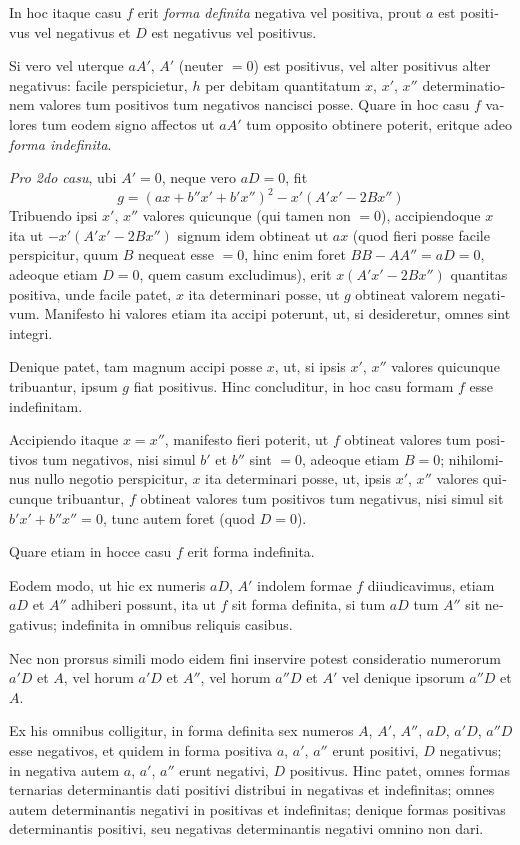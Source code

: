 \documentclass[12pt,a4paper]{article}
\theoremstyle{plain}
\theoremstyle{definition}
\theoremstyle{remark}
\begin{document}
\begin{otherlanguage}{latin}
In hoc itaque casu $f$ erit \emph{forma definita} negativa vel positiva, prout $a$ est positivus vel negativus et $D$ est negativus vel positivus.

Si vero vel uterque $aA'$, $A'$ (neuter $= 0$) est positivus, vel alter positivus alter negativus: facile perspicietur, $h$ per debitam quantitatum $x$, $x'$, $x''$ determinationem valores tum positivos tum negativos nancisci posse. Quare in hoc casu $f$ valores tum eodem signo affectos ut $aA'$ tum opposito obtinere poterit, eritque adeo \emph{forma indefinita}.

\textit{Pro 2do casu}, ubi $A' = 0$, neque vero $aD = 0$, fit
\[
g = (ax + b''x' + b'x'')^2 - x'(A'x' - 2Bx'')
\]
Tribuendo ipsi $x'$, $x''$ valores quicunque (qui tamen non $= 0$), accipiendoque $x$ ita ut $-x'(A'x' - 2Bx'')$ signum idem obtineat ut $ax$ (quod fieri posse facile perspicitur, quum $B$ nequeat esse $= 0$, hinc enim foret $BB - AA'' = aD = 0$, adeoque etiam $D = 0$, quem casum excludimus), erit $x(A'x' - 2Bx'')$ quantitas positiva, unde facile patet, $x$ ita determinari posse, ut $g$ obtineat valorem negativum. Manifesto hi valores etiam ita accipi poterunt, ut, si desideretur, omnes sint integri.

Denique patet, tam magnum accipi posse $x$, ut, si ipsis $x'$, $x''$ valores quicunque tribuantur, ipsum $g$ fiat positivus. Hinc concluditur, in hoc casu formam $f$ esse indefinitam.

Accipiendo itaque $x = x''$, manifesto fieri poterit, ut $f$ obtineat valores tum positivos tum negativos, nisi simul $b'$ et $b''$ sint $= 0$, adeoque etiam $B = 0$; nihilominus nullo negotio perspicitur, $x$ ita determinari posse, ut, ipsis $x'$, $x''$ valores quicunque tribuantur, $f$ obtineat valores tum positivos tum negativus, nisi simul sit $b'x' + b''x'' = 0$, tunc autem foret (quod $D = 0$).

Quare etiam in hocce casu $f$ erit forma indefinita.

Eodem modo, ut hic ex numeris $aD$, $A'$ indolem formae $f$ diiudicavimus, etiam $aD$ et $A''$ adhiberi possunt, ita ut $f$ sit forma definita, si tum $aD$ tum $A''$ sit negativus; indefinita in omnibus reliquis casibus.

Nec non prorsus simili modo eidem fini inservire potest consideratio numerorum $a'D$ et $A$, vel horum $a'D$ et $A''$, vel horum $a''D$ et $A'$ vel denique ipsorum $a''D$ et $A$.

Ex his omnibus colligitur, in forma definita sex numeros $A$, $A'$, $A''$, $aD$, $a'D$, $a''D$ esse negativos, et quidem in forma positiva $a$, $a'$, $a''$ erunt positivi, $D$ negativus; in negativa autem $a$, $a'$, $a''$ erunt negativi, $D$ positivus. Hinc patet, omnes formas ternarias determinantis dati positivi distribui in negativas et indefinitas; omnes autem determinantis negativi in positivas et indefinitas; denique formas positivas determinantis positivi, seu negativas determinantis negativi omnino non dari.


\end{otherlanguage}
\end{document}
